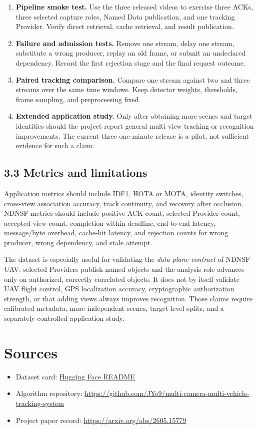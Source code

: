 \documentclass[10pt,a4paper]{article}
\begin{document}
\begin{enumerate}
  \item \textbf{Pipeline smoke test.} Use the three released videos to exercise
        three ACKs, three selected capture roles, Named Data publication, and
        one tracking Provider. Verify direct retrieval, cache retrieval, and
        result publication.
  \item \textbf{Failure and admission tests.} Remove one stream, delay one
        stream, substitute a wrong producer, replay an old frame, or submit an
        undeclared dependency. Record the first rejection stage and the final
        request outcome.
  \item \textbf{Paired tracking comparison.} Compare one stream against two
        and three streams over the same time windows. Keep detector weights,
        thresholds, frame sampling, and preprocessing fixed.
  \item \textbf{Extended application study.} Only after obtaining more scenes
        and target identities should the project report general multi-view
        tracking or recognition improvements. The current three one-minute
        release is a pilot, not sufficient evidence for such a claim.
\end{enumerate}

\subsection*{3.3 Metrics and limitations}

Application metrics should include IDF1, HOTA or MOTA, identity switches,
cross-view association accuracy, track continuity, and recovery after
occlusion. NDNSF metrics should include positive ACK count, selected Provider
count, accepted-view count, completion within deadline, end-to-end latency,
message/byte overhead, cache-hit latency, and rejection counts for wrong
producer, wrong dependency, and stale attempt.

The dataset is especially useful for validating the \emph{data-plane contract}
of NDNSF-UAV: selected Providers publish named objects and the analysis role
advances only on authorized, correctly correlated objects. It does not by
itself validate UAV flight control, GPS localization accuracy, cryptographic
authorization strength, or that adding views always improves recognition.
Those claims require calibrated metadata, more independent scenes, target-level
splits, and a separately controlled application study.

\section*{Sources}

\begin{itemize}
  \item Dataset card: \href{https://huggingface.co/datasets/jye9/Multi-Camera-Multi-Vehicle-Tracking-System/blob/main/README.md}{Hugging Face README}
  \item Algorithm repository: \url{https://github.com/JYe9/multi-camera-multi-vehicle-tracking-system}
  \item Project paper record: \url{https://arxiv.org/abs/2605.15779}
\end{itemize}
\end{document}

